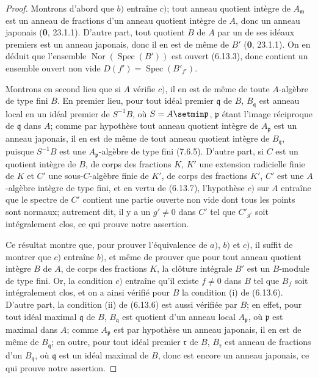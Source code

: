\begin{proof}
Montrons d'abord que $b)$ entraîne $c)$; tout anneau quotient intègre de
$A_{\mathfrak m}$ est un anneau de fractions d'un anneau quotient intègre de
$A$, donc un anneau japonais (\textbf{0}, 23.1.1). D'autre part, tout quotient $B$ de
$A$ par un de ses idéaux premiers est un anneau japonais, donc il en est de
même de $B'$ (\textbf{0}, 23.1.1). On en déduit que l'ensemble
$\operatorname{Nor}(\operatorname{Spec}(B'))$ est ouvert (6.13.3), donc
contient un ensemble ouvert non vide
$D(f')=\operatorname{Spec}(B'_{f'})$.


Montrons en second lieu que si $A$ vérifie $c)$, il en est de même de toute
$A$-algèbre de type fini $B$. En premier lieu, pour tout idéal premier
$\mathfrak q$ de $B$, $B_{\mathfrak q}$ est anneau local en un idéal premier
de $S^{-1}B$, où $S=A\setmin\mathfrak p$, $\mathfrak p$ étant l'image réciproque de
$\mathfrak q$ dans $A$; comme par hypothèse tout anneau quotient intègre de
$A_{\mathfrak p}$ est un anneau japonais, il en est de même de tout anneau
quotient intègre de $B_{\mathfrak q}$, puisque $S^{-1}B$ est une
$A_{\mathfrak p}$-algèbre de type fini (7.6.5). D'autre part, si $C$ est un
quotient intègre de $B$, de corps des fractions $K$, $K'$ une extension
radicielle finie de $K$ et $C'$ une sous-$C$-algèbre finie de $K'$, de corps
des fractions $K'$, $C'$ est une $A$-algèbre intègre de type fini, et en vertu
de (6.13.7), l'hypothèse $c)$ sur $A$ entraîne que le spectre de $C'$ contient
une partie ouverte non vide dont tous les points sont normaux; autrement dit,
il y a un $g'\neq0$ dans $C'$ tel que $C'_{g'}$ soit intégralement clos, ce qui
prouve notre assertion.

Ce résultat montre que, pour prouver l'équivalence de $a)$, $b)$ et $c)$, il
suffit de montrer que $c)$ entraîne $b)$, et même de prouver que pour tout
anneau quotient intègre $B$ de $A$, de corps des fractions $K$, la clôture
intégrale $B'$ est un $B$-module de type fini. Or, la condition $c)$ entraîne
qu'il existe $f\neq0$ dans $B$ tel que $B_f$ soit intégralement clos, et on a
ainsi vérifié pour $B$ la condition (i) de (6.13.6). D'autre part, la condition
(ii) de (6.13.6) est aussi vérifiée par $B$; en effet, pour tout idéal maximal
$\mathfrak q$ de $B$, $B_{\mathfrak q}$ est quotient d'un anneau local
$A_{\mathfrak p}$, où $\mathfrak p$ est maximal dans $A$; comme
$A_{\mathfrak p}$ est par hypothèse un anneau japonais, il en est de même de
$B_{\mathfrak q}$; en outre, pour tout idéal premier $\mathfrak r$ de $B$,
$B_{\mathfrak r}$ est anneau de fractions d'un $B_{\mathfrak q}$, où
$\mathfrak q$ est un idéal maximal de $B$, donc est encore un anneau japonais,
ce qui prouve notre assertion.


\end{proof}
